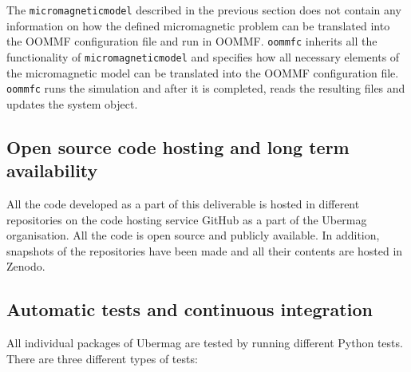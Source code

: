 \documentclass{deliverablereport}
\begin{document}
The \texttt{micromagneticmodel} described in the previous section does not
contain any information on how the defined micromagnetic problem can
be translated into the OOMMF configuration file and run in
OOMMF. \texttt{oommfc} inherits all the functionality of
\texttt{micromagneticmodel} and specifies how all necessary elements
of the micromagnetic model can be translated into the OOMMF
configuration file. \texttt{oommfc} runs the simulation and after it
is completed, reads the resulting files and updates the system object.

\subsection{Open source code hosting and long term availability}

All the code developed as a part of this deliverable is hosted in
different repositories on the code hosting service GitHub as a part of
the Ubermag organisation. All the code is open source and publicly
available. In addition, snapshots of the repositories have been made
and all their contents are hosted in Zenodo.

\subsection{Automatic tests and continuous integration}

All individual packages of Ubermag are tested by running different
Python tests. There are three different types of tests:
\end{document}
